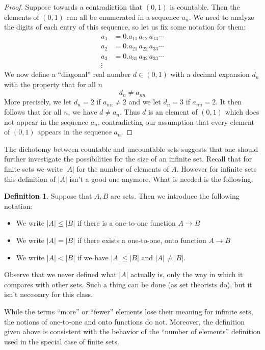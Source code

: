 \documentclass[11pt,oneside]{amsbook}
\theoremstyle{definition}
\theoremstyle{plain}
\theoremstyle{definition}
\newtheorem{defn}[thm]{Definition}
\theoremstyle{remark}
\numberwithin{equation}{section}
\numberwithin{figure}{section}
\begin{document}
\begin{proof}
  Suppose towards a contradiction that $(0,1)$ is countable. Then the elements of $(0,1)$ can all be enumerated in a sequence $a_n$. We need to analyze the digits of each entry of this sequence, so let us fix some notation for them:
  \begin{align*}
    a_1&=0.a_{11}\,a_{12}\,a_{13}\cdots\\
    a_2&=0.a_{21}\,a_{22}\,a_{33}\cdots\\
    a_3&=0.a_{31}\,a_{32}\,a_{33}\cdots\\
    \vdots&
  \end{align*}
  We now define a ``diagonal'' real number $d\in(0,1)$ with a decimal expansion $d_n$ with the property that for all $n$
  \[d_n\neq a_{nn}
  \]
  More precisely, we let $d_n=2$ if $a_{nn}\neq2$ and we let $d_n=3$ if $a_{nn}=2$. It then follows that for all $n$, we have $d\neq a_n$. Thus $d$ is an element of $(0,1)$ which does not appear in the sequence $a_n$, contradicting our assumption that every element of $(0,1)$ appears in the sequence $a_n$.
\end{proof}

The dichotomy between countable and uncountable sets suggests that one should further investigate the possibilities for the size of an infinite set. Recall that for finite sets we write $|A|$ for the number of elements of $A$. However for infinite sets this definition of $|A|$ isn't a good one anymore. What is needed is the following.

\begin{defn}
  Suppose that $A,B$ are sets. Then we introduce the following notation:
  \begin{itemize}
  \item We write $|A|\leq|B|$ if there is a one-to-one function $A\to B$
  \item We write $|A|=|B|$ if there exists a one-to-one, onto function $A\to B$
  \item We write $|A|<|B|$ if we have $|A|\leq|B|$ and $|A|\neq|B|$.
  \end{itemize}
\end{defn}

Observe that we never defined what $|A|$ actually is, only the way in which it compares with other sets. Such a thing can be done (as set theorists do), but it isn't necessary for this class.

While the terms ``more'' or ``fewer'' elements lose their meaning for infinite sets, the notions of one-to-one and onto functions do not. Moreover, the definition given above is consistent with the behavior of the ``number of elements'' definition used in the special case of finite sets.
\end{document}
